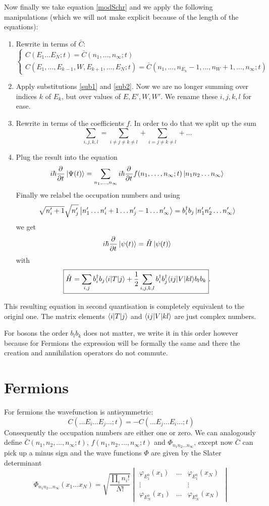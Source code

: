 Now finally we take equation \ref{modSchr} and we apply the following manipulations (which we will not make explicit because of the length of the equations):
\begin{enumerate}
\item Rewrite in terms of $\bar{C}$:
\[ \begin{cases}
C(E_1\ldots E_N; t) = \bar{C}(n_1,\ldots, n_\infty; t) \\
C(E_1, \ldots, E_{k-1},W,E_{k+1}, \ldots, E_N; t) = \bar{C}(n_1, \ldots, n_{E_k}-1, \ldots, n_W +1, \ldots, n_\infty; t)
\end{cases} \]
\item Apply substitutions \ref{sub1} and \ref{sub2}. Now we are no longer summing over indices $k$ of $E_k$, but over values of $E,E',W,W'$. We rename these $i,j,k,l$ for ease.
\item Rewrite in terms of the coefficients $f$. In order to do that we split up the sum
\[ \sum_{i,j,k,l} = \sum_{i\neq j \neq k \neq l} + \sum_{i = j \neq k \neq l} + \ldots \]
\item Plug the result into the equation
\[ i\hbar  \frac{\partial{^{}}}{\partial{{t}^{}}} \left| \Psi(t) \right\rangle = \sum_{n_1, \ldots, n_\infty} i\hbar  \frac{\partial{^{}}}{\partial{{t}^{}}} f(n_1,\ldots, n_\infty; t)\left| n_1n_2\ldots n_\infty \right\rangle  \]
Finally we relabel the occupation numbers and using
\[ \sqrt{n'_i + 1}\sqrt{n_j'}\left| n_1'\ldots n_i'+1 \ldots n'_j-1 \ldots n'_\infty \right\rangle = b^\dagger_i b_j\left| n_1'n_2'\ldots n'_\infty \right\rangle \]
we get
\[  i\hbar  \frac{\partial{^{}}}{\partial{{t}^{}}} \left| \psi(t) \right\rangle = \hat{H}\left| \psi(t) \right\rangle \]
with
\[ \boxed{\hat{H} = \sum_{i,j}b^\dagger_i b_j \braket[T]{i}{j} + \frac{1}{2}\sum_{i,j,k,l}b^\dagger_i b^\dagger_j \braket[V]{ij}{kl} b_lb_k}. \]
\end{enumerate}
This resulting equation in second quantisation is completely equivalent to the originl one. The matrix elements $\braket[T]{i}{j}$ and $\braket[V]{ij}{kl}$ are just complex numbers.


For bosons the order $b_lb_k$ does not matter, we write it in this order however because for Fermions the expression will be formally the same and there the creation and annihilation operators do not commute.

\section{Fermions}
For fermions the wavefunction is antisymmetric:
\[ C(\ldots E_i \ldots E_j \ldots;t) = - C(\ldots E_j \ldots E_i \ldots;t) \]
Consequently the occupation numbers are either one or zero. We can analogously define $\bar{C}(n_1,n_2,\ldots,n_\infty; t)$, $f(n_1,n_2,\ldots,n_\infty; t)$ and $\Phi_{n_1n_2\ldots n_\infty}$, except now $\bar{C}$ can pick up a minus sign and the wave functions $\Phi$ are given by the Slater determinant 
\[\Phi_{n_1n_2\ldots n_\infty}(x_1\ldots x_N) = \sqrt{\frac{\prod_i n_i!}{N!}}\begin{vmatrix}
\varphi_{E^0_1}(x_1) & \hdots & \varphi_{E^0_1}(x_N) \\
\vdots & & \vdots \\
\varphi_{E^0_N}(x_1) & \hdots & \varphi_{E^0_N}(x_N)
\end{vmatrix}\]


